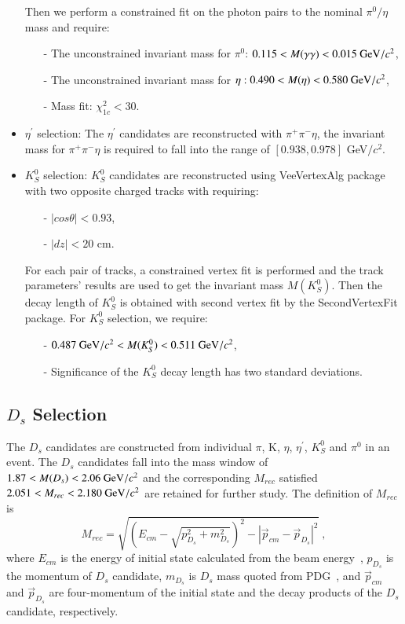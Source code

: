 \begin{itemize}
		Then we perform a constrained fit on the photon pairs to the nominal $\pi^{0}/\eta$ mass and require:
		\begin{itemize}
            \item[-] The unconstrained invariant mass for $\pi^{0}$: $0.115 < M(\gamma\gamma) < 0.015\ {\rm GeV}/c^{2}$,
            \item[-] The unconstrained invariant mass for $\eta: 0.490 < M(\eta) < 0.580\ {\rm GeV}/c^{2}$,
			\item[-] Mass fit: $\chi_{1c}^{2} < 30$.
		\end{itemize}
	\item $\eta^{'}$ selection: The $\eta^{'}$ candidates are reconstructed with $\pi^{+}\pi^{-}\eta$, the invariant mass for $\pi^{+}\pi^{-}\eta$ is required to fall into the range of $[0.938, 0.978]$ GeV$/c^{2}$.
	\item $K_{S}^{0}$ selection: $K_{S}^{0}$ candidates are reconstructed using VeeVertexAlg package with two opposite charged tracks with requiring:
		\begin{itemize}
			\item[-] $|cos\theta| < 0.93$,
			\item[-] $|dz| < 20$ cm.
		\end{itemize}

		For each pair of tracks, a constrained vertex fit is performed and the track parameters' results are used to get the invariant mass $M(K_{S}^{0})$. Then the decay length of $K_{S}^{0}$ is obtained with second vertex 
		fit by the SecondVertexFit package. For $K_{S}^{0}$ selection, we require:
		\begin{itemize}
            \item[-] ${\rm 0.487\ GeV}/c^{2} < M(K_S^{0}) < 0.511\ {\rm GeV}/c^{2}$,
			\item[-] Significance of the $K_{S}^{0}$ decay length has two standard deviations.
		\end{itemize}

\end{itemize}
\subsection{$D_{s}$ Selection}
The $D_{s}$ candidates are constructed from individual $\pi$, K, $\eta$, $\eta^{'}$, $K_{S}^{0}$ and $\pi^{0}$ in an event.
The $D_{s}$ candidates fall into the mass window of $1.87 < M(D_{s}) < 2.06\ {\rm GeV}/c^{2}$ and 
the corresponding $M_{rec}$ satisfied $2.051 < M_{rec} < 2.180\ {\rm GeV}/c^{2}$ are retained for further study. The definition of $M_{rec}$ is
\begin{equation}
    M_{rec} = \sqrt{(E_{cm} - \sqrt{p_{D_{s}}^{2} + m_{D_{s}}^{2}})^{2} - |\vec p_{cm} - \vec p_{D_{s}} | ^{2}} \; , \label{con:inventoryflow}
\end{equation}
where $E_{cm}$ is the energy of initial state calculated from the beam energy~\cite{DocDB 580-v1}, $p_{D_{s}}$ is the momentum of $D_{s}$ candidate, $m_{D_{s}}$ is $D_{s}$ mass quoted from PDG~\cite{PDG2018}, and $\vec p_{cm}$ and $\vec p_{D_{s}}$ are four-momentum of the initial state and the decay products of the $D_{s}$ candidate, respectively.

